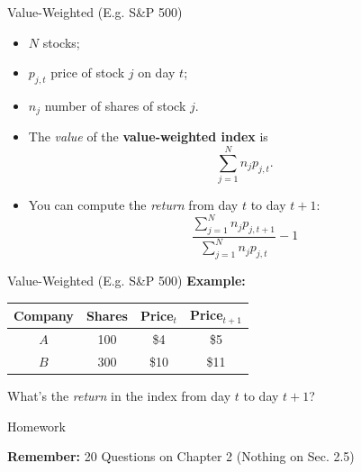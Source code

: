 \documentclass{beamer}
\begin{document}
\begin{frame}{Value-Weighted (E.g. S\&P 500)}
\begin{itemize}
\item $N$ stocks; 
\item $p_{j,t}$ price of stock $j$ on day $t$; 
\item $n_{j}$ number of shares of stock $j$. 
\item The \textit{value} of the \textbf{value-weighted index} is
\begin{equation}
\sum_{j=1}^{N}{n_{j}p_{j,t}}.
\end{equation}
\item You can compute the \textit{return} from day $t$ to day $t+1$: 
\begin{equation}
\frac{\sum_{j=1}^{N}{n_{j}p_{j,t+1}}}{\sum_{j=1}^{N}{n_{j}p_{j,t}}}-1
\end{equation}
\end{itemize}
\end{frame}

\begin{frame}{Value-Weighted (E.g. S\&P 500)}
\textbf{Example:}
\begin{center}
\begin{tabular}{cccc}
\textbf{Company} & \textbf{Shares} & \textbf{Price$_{t}$} & \textbf{Price$_{t+1}$} \\ \hline
$A$ & 100 & \$4 & \$5 \\
$B$ & 300 & \$10 & \$11
\end{tabular}
\end{center}
\begin{center}
What's the \textit{return} in the index from day $t$ to day $t+1$?
\end{center}
\end{frame}


\begin{frame}{Homework}
\begin{center}
\textbf{Remember:} 20 Questions on Chapter 2 (Nothing on Sec. 2.5)
\end{center}
\end{frame}
\end{document}
